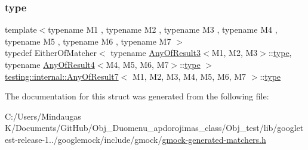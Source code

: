 \subsubsection{\texorpdfstring{type}{type}}
{\footnotesize\ttfamily template$<$typename M1 , typename M2 , typename M3 , typename M4 , typename M5 , typename M6 , typename M7 $>$ \\
typedef Either\+Of\+Matcher$<$ typename \mbox{\hyperlink{structtesting_1_1internal_1_1_any_of_result3}{Any\+Of\+Result3}}$<$M1, M2, M3$>$\+::\mbox{\hyperlink{structtesting_1_1internal_1_1_any_of_result7_a976873478921520833464a86f840abe8}{type}}, typename \mbox{\hyperlink{structtesting_1_1internal_1_1_any_of_result4}{Any\+Of\+Result4}}$<$M4, M5, M6, M7$>$\+::\mbox{\hyperlink{structtesting_1_1internal_1_1_any_of_result7_a976873478921520833464a86f840abe8}{type}} $>$ \mbox{\hyperlink{structtesting_1_1internal_1_1_any_of_result7}{testing\+::internal\+::\+Any\+Of\+Result7}}$<$ M1, M2, M3, M4, M5, M6, M7 $>$\+::\mbox{\hyperlink{structtesting_1_1internal_1_1_any_of_result7_a976873478921520833464a86f840abe8}{type}}}



The documentation for this struct was generated from the following file\+:\begin{DoxyCompactItemize}
\item 
C\+:/\+Users/\+Mindaugas K/\+Documents/\+Git\+Hub/\+Obj\+\_\+\+Duomenu\+\_\+apdorojimas\+\_\+class/\+Obj\+\_\+test/lib/googletest-\/release-\/1../googlemock/include/gmock/\mbox{\hyperlink{_obj__test_2lib_2googletest-release-1_88_81_2googlemock_2include_2gmock_2gmock-generated-matchers_8h}{gmock-\/generated-\/matchers.\+h}}\end{DoxyCompactItemize}
